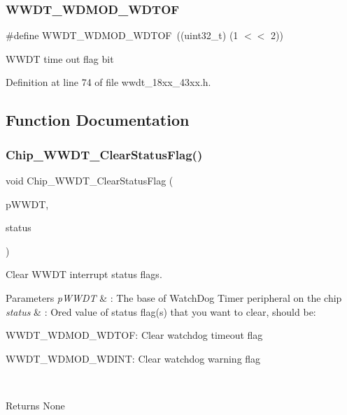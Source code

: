 \subsubsection{\texorpdfstring{W\+W\+D\+T\+\_\+\+W\+D\+M\+O\+D\+\_\+\+W\+D\+T\+OF}{WWDT\_WDMOD\_WDTOF}}
{\footnotesize\ttfamily \#define W\+W\+D\+T\+\_\+\+W\+D\+M\+O\+D\+\_\+\+W\+D\+T\+OF~((uint32\+\_\+t) (1 $<$$<$ 2))}

W\+W\+DT time out flag bit 

Definition at line 74 of file wwdt\+\_\+18xx\+\_\+43xx.\+h.



\subsection{Function Documentation}
\mbox{\label{group___w_w_d_t__18_x_x__43_x_x_ga6e6453450170638f554e7ba3c548ec4a}} 
\subsubsection{\texorpdfstring{Chip\+\_\+\+W\+W\+D\+T\+\_\+\+Clear\+Status\+Flag()}{Chip\_WWDT\_ClearStatusFlag()}}
{\footnotesize\ttfamily void Chip\+\_\+\+W\+W\+D\+T\+\_\+\+Clear\+Status\+Flag (\begin{DoxyParamCaption}\item[{\hyperlink{struct_l_p_c___w_w_d_t___t}{L\+P\+C\+\_\+\+W\+W\+D\+T\+\_\+T} $\ast$}]{p\+W\+W\+DT,  }\item[{uint32\+\_\+t}]{status }\end{DoxyParamCaption})}



Clear W\+W\+DT interrupt status flags. 


\begin{DoxyParams}{Parameters}
{\em p\+W\+W\+DT} & \+: The base of Watch\+Dog Timer peripheral on the chip \\
\hline
{\em status} & \+: Or\textquotesingle{}ed value of status flag(s) that you want to clear, should be\+:
\begin{DoxyItemize}
\item W\+W\+D\+T\+\_\+\+W\+D\+M\+O\+D\+\_\+\+W\+D\+T\+OF\+: Clear watchdog timeout flag
\item W\+W\+D\+T\+\_\+\+W\+D\+M\+O\+D\+\_\+\+W\+D\+I\+NT\+: Clear watchdog warning flag 
\end{DoxyItemize}\\
\hline
\end{DoxyParams}
\begin{DoxyReturn}{Returns}
None 
\end{DoxyReturn}


